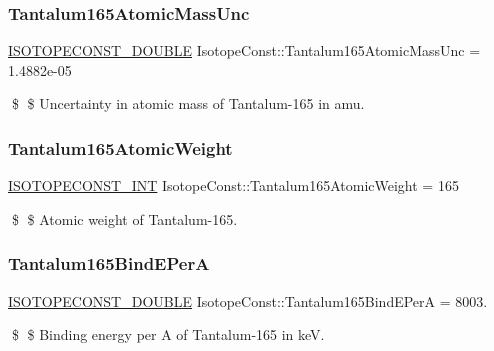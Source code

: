 \subsubsection{\texorpdfstring{Tantalum165\+Atomic\+Mass\+Unc}{Tantalum165AtomicMassUnc}}
{\footnotesize\ttfamily \mbox{\hyperlink{group___isotope_const-_macros_ga8f45a7272ce02c0b4c65c44636ed719a}{I\+S\+O\+T\+O\+P\+E\+C\+O\+N\+S\+T\+\_\+\+D\+O\+U\+B\+LE}} Isotope\+Const\+::\+Tantalum165\+Atomic\+Mass\+Unc = 1.\+4882e-\/05}

\$ \$ Uncertainty in atomic mass of Tantalum-\/165 in amu. \mbox{\label{group___isotope_const-_tantalum-_ta165_gad5b9489fb3c61667e2788ac0934bcb62}} 
\subsubsection{\texorpdfstring{Tantalum165\+Atomic\+Weight}{Tantalum165AtomicWeight}}
{\footnotesize\ttfamily \mbox{\hyperlink{group___isotope_const-_macros_ga5f18360b3e99483a35c32d789e62621c}{I\+S\+O\+T\+O\+P\+E\+C\+O\+N\+S\+T\+\_\+\+I\+NT}} Isotope\+Const\+::\+Tantalum165\+Atomic\+Weight = 165}

\$ \$ Atomic weight of Tantalum-\/165. \mbox{\label{group___isotope_const-_tantalum-_ta165_gae5981e959af7c6a0f65ab8021e883678}} 
\subsubsection{\texorpdfstring{Tantalum165\+Bind\+E\+PerA}{Tantalum165BindEPerA}}
{\footnotesize\ttfamily \mbox{\hyperlink{group___isotope_const-_macros_ga8f45a7272ce02c0b4c65c44636ed719a}{I\+S\+O\+T\+O\+P\+E\+C\+O\+N\+S\+T\+\_\+\+D\+O\+U\+B\+LE}} Isotope\+Const\+::\+Tantalum165\+Bind\+E\+PerA = 8003.}

\$ \$ Binding energy per A of Tantalum-\/165 in keV. \mbox{\label{group___isotope_const-_tantalum-_ta165_gadca3e65b889c8458817f61350dadb056}} 
